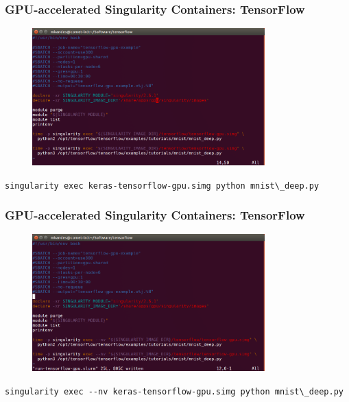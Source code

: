 \documentclass{beamer}
\begin{document}
\begin{frame}
   \frametitle{GPU-accelerated Singularity Containers: TensorFlow}
   \begin{figure}[htbp]
      \includegraphics[width=0.8\textwidth]{images/tensorflow-singularity-gpu-example-batch-job.png}
   \end{figure}
   \lstinline{singularity exec keras-tensorflow-gpu.simg python mnist\_deep.py}
\end{frame}

\begin{frame}
   \frametitle{GPU-accelerated Singularity Containers: TensorFlow}
   \begin{figure}[htbp]
      \includegraphics[width=0.8\textwidth]{images/tensorflow-singularity-gpu-example-batch-job-with--nv.png}
   \end{figure}
   \lstinline{singularity exec --nv keras-tensorflow-gpu.simg python mnist\_deep.py}
\end{frame}
\end{document}
